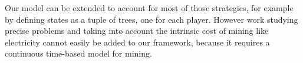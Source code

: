 \documentclass[a4paper,english,cleveref, autoref,numberwithinsect]{lipics-v2019}
\begin{document}
Our model can be extended to account for most of those strategies, for example by defining states as a tuple of trees, one for each player. 
However work studying precise problems and taking into account the intrinsic cost of mining like electricity \cite{tsabary2018gap,biais2018blockchain} cannot easily be added to our framework, because it requires a continuous time-based model for mining.
\end{document}
